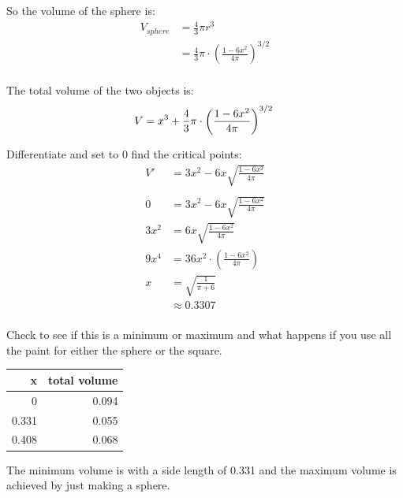 \documentclass[fleqn]{exam}
\begin{document}
\begin{description}
So the volume of the sphere is: 
\begin{align*}
  V_{sphere} &= \frac{4}{3} \pi r^3 \\
  &= \frac{4}{3} \pi \cdot \left(\frac{1 - 6x^2}{4 \pi} \right)^{3/2} \\
\end{align*}

The total volume of the two objects is:
\[
  V = x^3 + \frac{4}{3} \pi \cdot \left(\frac{1 - 6x^2}{4 \pi} \right)^{3/2} \\
\]

Differentiate and set to 0 find the critical points:
\begin{align*}
  V' &= 3x^2 - 6 x \sqrt{\frac{1 - 6x^2}{4 \pi}} \\
\\
  0 &= 3x^2 - 6 x \sqrt{\frac{1 - 6x^2}{4 \pi}} \\
  3x^2 &= 6 x \sqrt{\frac{1 - 6x^2}{4 \pi}} \\
  9x^4 &= 36 x^2 \cdot \left( \frac{1 - 6x^2}{4 \pi} \right) \\
  x &= \sqrt{\frac{1}{\pi + 6}} \\
    &\approx 0.3307 \\
\end{align*}

Check to see if this is a minimum or maximum and what happens if you use all the paint for either the sphere or the square.
\begin{tabular}{rr}
\toprule
x & total volume \\
\midrule
0      & 0.094 \\
0.331  & 0.055 \\
0.408  & 0.068 \\
\bottomrule
\end{tabular}

The minimum volume is with a side length of 0.331 and the maximum volume is achieved by just making a sphere.

\end{description}

\pagebreak

\fi
\end{document}
